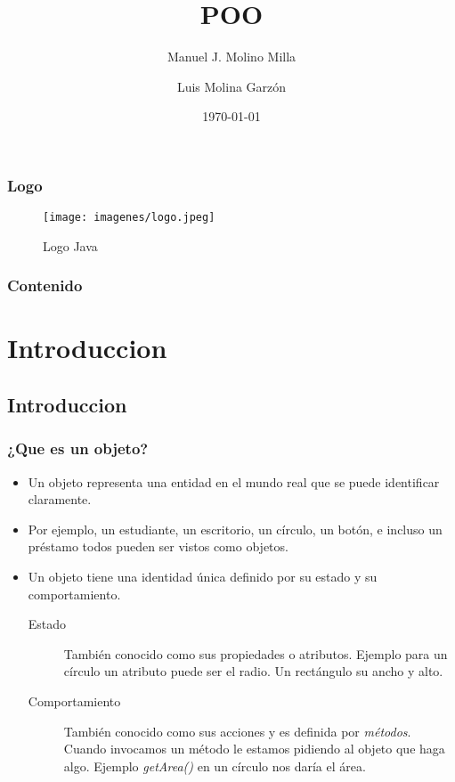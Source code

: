 \documentclass{beamer}
\title{POO}
\author{Manuel J. Molino Milla \and Luis Molina Garzón}
\date{\today} %
\institute{IES Virgen del Carmen \and Departamento de Informática}
\begin{document}
\begin{frame}
  \titlepage
\end{frame}

\begin{frame}
    \frametitle{Logo}
\begin{figure}
\texttt{[image: imagenes/logo.jpeg]} 
\caption{Logo Java}
\end{figure}
\end{frame}

\begin{frame}
  \frametitle{Contenido}
  \tableofcontents[pausesections]
\end{frame}



\section{Introduccion}

\subsection{Introduccion}
\begin{frame}
\frametitle{¿Que es un objeto?}
\begin{itemize}[<+->]
\item Un objeto representa una entidad en el mundo real que se puede identificar claramente.
\item Por ejemplo, un estudiante, un escritorio, un círculo, un botón, e incluso un préstamo todos pueden ser vistos como objetos.
\item Un objeto tiene una identidad única definido por su estado y su comportamiento.
\begin{description}
\item[Estado] También conocido como sus propiedades o atributos. Ejemplo para un círculo un atributo puede ser el radio. Un rectángulo su ancho y alto.
\item[Comportamiento] También conocido como sus acciones y es definida por \emph{métodos}. Cuando invocamos un método le estamos pidiendo al objeto que haga algo. Ejemplo \emph{getArea()} en un círculo nos daría el área. 
\end{description}
\end{itemize}
\pause
\end{frame}
\end{document}
